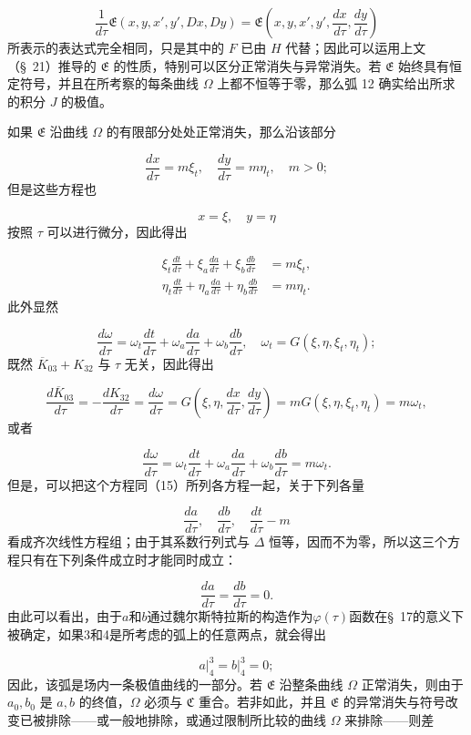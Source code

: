 \documentclass[11pt,a4paper,leqno]{article}
\begin{document}
\[
\frac{1}{d\tau}\mathfrak{E}(x,y,x',y',Dx,Dy)=
\mathfrak{E}\left(x,y,x',y',\frac{dx}{d\tau},\frac{dy}{d\tau}\right)
\]
所表示的表达式完全相同，只是其中的 $F$ 已由 $H$ 代替；因此可以运用上文（\S~21）推导的 $\mathfrak{E}$ 的性质，特别可以区分正常消失与异常消失。若 $\mathfrak{E}$ 始终具有恒定符号，并且在所考察的每条曲线 $\Omega$ 上都不恒等于零，那么弧 12 确实给出所求的积分 $J$ 的极值。

如果 $\mathfrak{E}$ 沿曲线 $\Omega$ 的有限部分处处正常消失，那么沿该部分

\[
\frac{dx}{d\tau}=m\xi_t,
\quad
\frac{dy}{d\tau}=m\eta_t,
\quad
m>0;
\]
但是这些方程也

\[
x=\xi,
\quad
 y=\eta
\]
按照 $\tau$ 可以进行微分，因此得出

\begin{equation}\tag{15}
\begin{aligned}
\xi_t\frac{dt}{d\tau}+\xi_a\frac{da}{d\tau}+\xi_b\frac{db}{d\tau}&=m\xi_t,\\
\eta_t\frac{dt}{d\tau}+\eta_a\frac{da}{d\tau}+\eta_b\frac{db}{d\tau}&=m\eta_t.
\end{aligned}
\end{equation}
此外显然

\[
\frac{d\omega}{d\tau}=\omega_t\frac{dt}{d\tau}+\omega_a\frac{da}{d\tau}+\omega_b\frac{db}{d\tau},
\quad
\omega_t=G(\xi,\eta,\xi_t,\eta_t);
\]
既然 $\overline{K}_{03}+K_{32}$ 与 $\tau$ 无关，因此得出

\[
\frac{d\overline{K}_{03}}{d\tau}=-\frac{dK_{32}}{d\tau}=\frac{d\omega}{d\tau}=G\left(\xi,\eta,\frac{dx}{d\tau},\frac{dy}{d\tau}\right)
=mG(\xi,\eta,\xi_t,\eta_t)=m\omega_t,
\]
或者

\[
\frac{d\omega}{d\tau}=\omega_t\frac{dt}{d\tau}+\omega_a\frac{da}{d\tau}+\omega_b\frac{db}{d\tau}=m\omega_t.
\]
但是，可以把这个方程同（15）所列各方程一起，关于下列各量

\[
\frac{da}{d\tau},
\quad
\frac{db}{d\tau},
\quad
\frac{dt}{d\tau}-m
\]
看成齐次线性方程组；由于其系数行列式与 $\Delta$ 恒等，因而不为零，所以这三个方程只有在下列条件成立时才能同时成立：

\[
\frac{da}{d\tau}=\frac{db}{d\tau}=0.
\]
由此可以看出，由于$a$和$b$通过魏尔斯特拉斯的构造作为$\varphi(\tau)$函数在\S~17的意义下被确定，如果3和4是所考虑的弧上的任意两点，就会得出

\[
a\bigg|_4^3=b\bigg|_4^3=0;
\]
因此，该弧是场内一条极值曲线的一部分。若 $\mathfrak{E}$ 沿整条曲线 $\Omega$ 正常消失，则由于 $a_0,b_0$ 是 $a,b$ 的终值，$\Omega$ 必须与 $\mathfrak{C}$ 重合。若非如此，并且 $\mathfrak{E}$ 的异常消失与符号改变已被排除——或一般地排除，或通过限制所比较的曲线 $\Omega$ 来排除——则差
\end{document}

